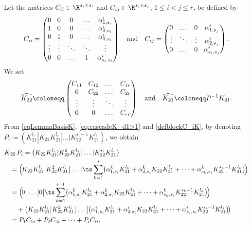 Let the matrices $C_{ii} \in \R^{s_i \times s_i}$ and $C_{ij} \in \R^{s_i \times s_j}$, $1 \leq i < j \leq r$, be defined by
\begin{equation}\arraycolsep4.5pt
C_{ii} = \begin{pmatrix} 0 & 0 & 0 & \dots & \alpha_{1, s_i}^i\\
1 & 0 & 0 & \dots & \alpha_{2, s_i}^i\\
0 & 1 & 0 & \dots & \alpha_{3, s_i}^i \\
\vdots & \vdots & \ddots & \ddots & \vdots\\
0 & 0 & \dots & 1 & \alpha_{s_i,s_i}^i
\end{pmatrix}\quad \text{and}\quad
C_{ij} = \begin{pmatrix} 0 & \dots & 0 & \alpha_{1, s_j}^i\\
\vdots & \ddots & \vdots & \alpha_{2, s_j}^i\\
0 & \dots & 0 & \alpha_{s_i,s_j}^i
\end{pmatrix}.
\label{defblockC_iK}
\end{equation}
We set
\begin{equation}
\label{eq:cascadeK_d1>1}\arraycolsep4.5pt
\widehat{K_{22}}\coloneqq \begin{pmatrix} C_{11} & C_{12} & \dots & C_{1r}\\
0 & C_{22} &\dots &C_{2r}\\
\vdots & \vdots & \ddots & \vdots \\
0 & 0 &\dots & C_{rr}\\
\end{pmatrix}\quad \text{and}\quad
\widehat{K_{21}}\coloneqq P^{-1} K_{21}.
\end{equation}
From \eqref{eqLemmaBasisK}, \eqref{eq:cascadeK_d1>1} and \eqref{defblockC_iK}, by denoting $P_ i \coloneqq \left(K_{21}^{l_i} | K_{22} K_{21}^{l_i} | \dots | K_{22}^{s_i-1} K_{21}^{l_i}\right)$, we obtain
\begin{align*}
K&_{22}\, P_i = \bigl(K_{22}K_{21}^{l_i} | K_{22}^2 K_{21}^{l_i} | \dots | K_{22}^{s_i} K_{21}^{l_i}\bigr)\\
&= \Bigl(\!K_{22}K_{21}^{l_i} \big| K_{22}^2 K_{21}^{l_i} \big| \dots \big| \ts\sum_{k=1}^i \bigl(\alpha_{1, s_i}^k K_{21}^{l_k} + \alpha_{2, s_i}^k K_{22} K_{21}^{l_k} + \dots + \alpha_{s_k,s_i}^k K_{22}^{s_k-1} K_{21}^{l_k}\bigr)\! \Bigr)\\
&= \Bigl(\!0 \big| \dots \big| 0 \big| \ts\sum_{k=1}^{i-1} \bigl(\alpha_{1, s_i}^k K_{21}^{l_k} + \alpha_{2, s_i}^k K_{22} K_{21}^{l_k} + \dots + \alpha_{s_k,s_i}^k K_{22}^{s_k-1} K_{21}^{l_k}\bigr)\! \Bigr)\\
&\quad + \bigl(K_{22}K_{21}^{l_i} \big| K_{22}^2 K_{21}^{l_i} \big| \dots \big| \bigl(\alpha_{1, s_i}^i K_{21}^{l_i} + \alpha_{2, s_i}^i K_{22} K_{21}^{l_i} + \dots + \alpha_{s_i,s_i}^i K_{22}^{s_i-1} K_{21}^{l_i}\bigr)\! \bigr) \\
&= P_1 C_{1i} + P_{2} C_{2i} + \dots + P_{i} C_{ii}.
\end{align*}
